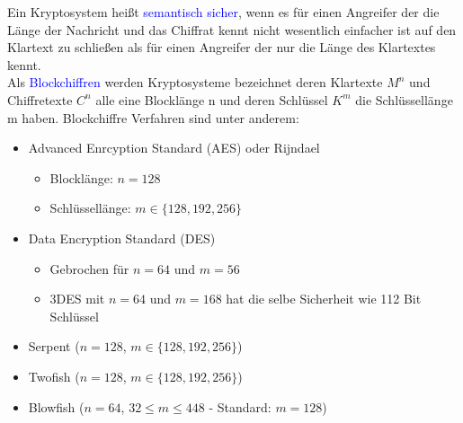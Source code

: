 \documentclass[a4paper,12pt]{article}
\newcommand{\blue}[1]{\textcolor{blue}{#1}}
\begin{document}
Ein Kryptosystem heißt \blue{semantisch sicher}, wenn es für einen Angreifer der die Länge der Nachricht und das Chiffrat kennt nicht wesentlich einfacher ist auf den Klartext zu schließen als für einen Angreifer der nur die Länge des Klartextes kennt.\\
Als \blue{Blockchiffren} werden Kryptosysteme bezeichnet deren Klartexte $M^n$ und Chiffretexte $C^n$ alle eine Blocklänge n und deren Schlüssel $K^m$ die Schlüssellänge m haben.
Blockchiffre Verfahren sind unter anderem:
\begin{itemize}
\item Advanced Enrcyption Standard (AES) oder Rijndael
	\begin{itemize}
	\item Blocklänge: $n= 128$
	\item Schlüssellänge: $m\in \{128,192,256\}$
	\end{itemize}
\item Data Encryption Standard (DES)
	\begin{itemize}
	\item Gebrochen für $n=64$ und $m=56$
	\item 3DES mit $n=64$ und $m=168$ hat die selbe Sicherheit wie 112 Bit Schlüssel
	\end{itemize}
\item Serpent ($n=128$, $m\in\{128,192,256\}$)
\item Twofish ($n=128$, $m\in\{128,192,256\}$)
\item Blowfish ($n=64$, $32\leq m\leq 448$ - Standard: $m=128$)
\end{itemize}
\end{document}
